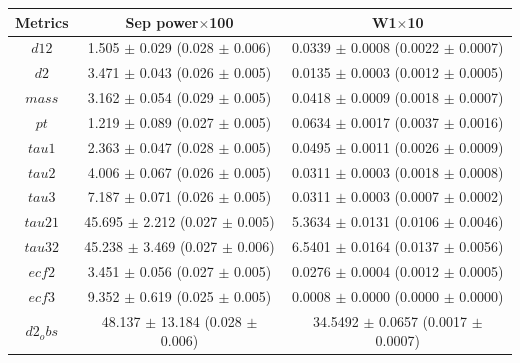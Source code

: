 \begin{ruledtabular}
  \begin{tabular}{ccc}
  \textbf{Metrics} & \textbf{Sep power}$\times$100 & \textbf{W1}$\times$10 \\
  \hline
  \textbf{$d12$} & 1.505 $\pm$ 0.029 (0.028 $\pm$ 0.006) & 0.0339 $\pm$ 0.0008 (0.0022 $\pm$ 0.0007) \\
  \textbf{$d2$} & 3.471 $\pm$ 0.043 (0.026 $\pm$ 0.005) & 0.0135 $\pm$ 0.0003 (0.0012 $\pm$ 0.0005) \\
  \textbf{$mass$} & 3.162 $\pm$ 0.054 (0.029 $\pm$ 0.005) & 0.0418 $\pm$ 0.0009 (0.0018 $\pm$ 0.0007) \\
  \textbf{$pt$} & 1.219 $\pm$ 0.089 (0.027 $\pm$ 0.005) & 0.0634 $\pm$ 0.0017 (0.0037 $\pm$ 0.0016) \\
  \textbf{$tau1$} & 2.363 $\pm$ 0.047 (0.028 $\pm$ 0.005) & 0.0495 $\pm$ 0.0011 (0.0026 $\pm$ 0.0009) \\
  \textbf{$tau2$} & 4.006 $\pm$ 0.067 (0.026 $\pm$ 0.005) & 0.0311 $\pm$ 0.0003 (0.0018 $\pm$ 0.0008) \\
  \textbf{$tau3$} & 7.187 $\pm$ 0.071 (0.026 $\pm$ 0.005) & 0.0311 $\pm$ 0.0003 (0.0007 $\pm$ 0.0002) \\
  \textbf{$tau21$} & 45.695 $\pm$ 2.212 (0.027 $\pm$ 0.005) & 5.3634 $\pm$ 0.0131 (0.0106 $\pm$ 0.0046) \\
  \textbf{$tau32$} & 45.238 $\pm$ 3.469 (0.027 $\pm$ 0.006) & 6.5401 $\pm$ 0.0164 (0.0137 $\pm$ 0.0056) \\
  \textbf{$ecf2$} & 3.451 $\pm$ 0.056 (0.027 $\pm$ 0.005) & 0.0276 $\pm$ 0.0004 (0.0012 $\pm$ 0.0005) \\
  \textbf{$ecf3$} & 9.352 $\pm$ 0.619 (0.025 $\pm$ 0.005) & 0.0008 $\pm$ 0.0000 (0.0000 $\pm$ 0.0000) \\
  \textbf{$d2_obs$} & 48.137 $\pm$ 13.184 (0.028 $\pm$ 0.006) & 34.5492 $\pm$ 0.0657 (0.0017 $\pm$ 0.0007) \\
  \end{tabular}
\end{ruledtabular}